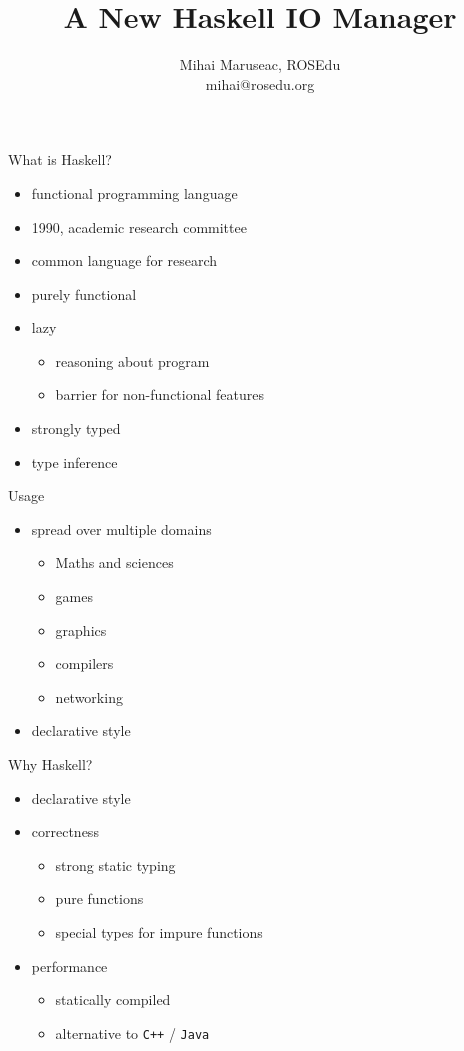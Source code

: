 \documentclass{beamer}
\title{A New Haskell IO Manager}
\author{Mihai Maruseac, ROSEdu\\mihai@rosedu.org}
\begin{document}
\maketitle

\begin{frame}{What is Haskell?}
  \begin{itemize}
    \item functional programming language
    \item 1990, academic research committee
    \item common language for research
    \pause
    \item purely functional
    \item lazy
    \begin{itemize}
      \item reasoning about program
      \item barrier for non-functional features
    \end{itemize}
    \pause
    \item strongly typed
    \item type inference
  \end{itemize}
\end{frame}

\begin{frame}{Usage}
  \begin{itemize}
    \item spread over multiple domains
    \begin{itemize}
      \item Maths and sciences
      \item games
      \item graphics
      \item compilers
      \item networking
    \end{itemize}
    \item declarative style
  \end{itemize}
  
\end{frame}

\begin{frame}{Why Haskell?}
  \begin{itemize}
    \item declarative style
    \pause
    \item correctness
    \begin{itemize}
      \item strong static typing
      \item pure functions
      \item special types for impure functions
    \end{itemize}
    \pause
    \item performance
    \begin{itemize}
      \item statically compiled
      \item alternative to \texttt{C++} / \texttt{Java}
    \end{itemize}
  \end{itemize}
\end{frame}
\end{document}
